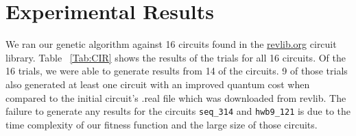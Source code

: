 \section{Experimental Results}

We ran our genetic algorithm against 16 circuits found in the \url{revlib.org} circuit library. Table ~\ref{Tab:CIR} shows the 
results of the trials for all 16 circuits. Of the 16 trials, we were able to generate results from 14 of the circuits. 9 of those 
trials also generated at least one circuit with an improved quantum cost when compared to the initial circuit's .real file which 
was downloaded from revlib. The failure to generate any results for the circuits \verb!seq_314! and \verb!hwb9_121! is due to the 
time complexity of our fitness function and the large size of those circuits. 

